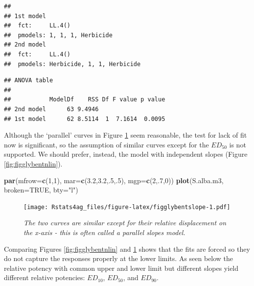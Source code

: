 \documentclass[letterpaper,]{book}
\newenvironment{Shaded}{\begin{snugshade}}{\end{snugshade}}
\newcommand{\DataTypeTok}[1]{\textcolor[rgb]{0.13,0.29,0.53}{#1}}
\newcommand{\DecValTok}[1]{\textcolor[rgb]{0.00,0.00,0.81}{#1}}
\newcommand{\FloatTok}[1]{\textcolor[rgb]{0.00,0.00,0.81}{#1}}
\newcommand{\KeywordTok}[1]{\textcolor[rgb]{0.13,0.29,0.53}{\textbf{#1}}}
\newcommand{\NormalTok}[1]{#1}
\newcommand{\OtherTok}[1]{\textcolor[rgb]{0.56,0.35,0.01}{#1}}
\newcommand{\StringTok}[1]{\textcolor[rgb]{0.31,0.60,0.02}{#1}}
\begin{document}
\begin{verbatim}
## 
## 1st model
##  fct:     LL.4()
##  pmodels: 1, 1, 1, Herbicide
## 2nd model
##  fct:     LL.4()
##  pmodels: Herbicide, 1, 1, Herbicide
\end{verbatim}

\begin{verbatim}
## ANOVA table
## 
##           ModelDf    RSS Df F value p value
## 2nd model      63 9.4946                   
## 1st model      62 8.5114  1  7.1614  0.0095
\end{verbatim}

Although the `parallel' curves in Figure \ref{fig:figglybentslope} seem reasonable, the test for lack of fit now is significant, so the assumption of similar curves except for the \(ED_{50}\) is not supported. We should prefer, instead, the model with independent slopes (Figure \ref{fig:figglybentnlin}).



\begin{Shaded}
\begin{Highlighting}[]
\KeywordTok{par}\NormalTok{(}\DataTypeTok{mfrow=}\KeywordTok{c}\NormalTok{(}\DecValTok{1}\NormalTok{,}\DecValTok{1}\NormalTok{), }\DataTypeTok{mar=}\KeywordTok{c}\NormalTok{(}\FloatTok{3.2}\NormalTok{,}\FloatTok{3.2}\NormalTok{,.}\DecValTok{5}\NormalTok{,.}\DecValTok{5}\NormalTok{), }\DataTypeTok{mgp=}\KeywordTok{c}\NormalTok{(}\DecValTok{2}\NormalTok{,.}\DecValTok{7}\NormalTok{,}\DecValTok{0}\NormalTok{))}
\KeywordTok{plot}\NormalTok{(S.alba.m3, }\DataTypeTok{broken=}\OtherTok{TRUE}\NormalTok{, }\DataTypeTok{bty=}\StringTok{"l"}\NormalTok{)}
\end{Highlighting}
\end{Shaded}

\begin{figure}
\centering
\texttt{[image: Rstats4ag\_files/figure-latex/figglybentslope-1.pdf]}
\caption{\label{fig:figglybentslope}\emph{The two curves are similar except for their relative displacement on the x-axis - this is often called a parallel slopes model.}}
\end{figure}

Comparing Figures \ref{fig:figglybentnlin} and \ref{fig:figglybentslope} shows that the fits are forced so they do not capture the responses properly at the lower limits. As seen below the relative potency with common upper and lower limit but different slopes yield different relative potencies: \(ED_{10}\), \(ED_{50}\), and \(ED_{90}\).
\end{document}
